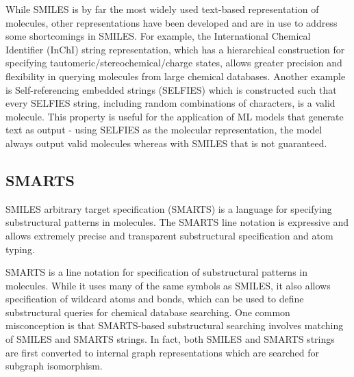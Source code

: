 While SMILES is by far the most widely used text-based representation of molecules, other representations have been developed and are in use to address some shortcomings in SMILES. For example, the International Chemical Identifier (InChI) \cite{Heller2013InChI} string representation, which has a hierarchical construction for specifying tautomeric/stereochemical/charge states, allows greater precision and flexibility in querying molecules from large chemical databases. Another example is Self-referencing embedded strings (SELFIES) \cite{Krenn2020Selfies} which is constructed such that every SELFIES string, including random combinations of characters, is a valid molecule. This property is useful for the application of ML models that generate text as output - using SELFIES as the molecular representation, the model always output valid molecules whereas with SMILES that is not guaranteed.

\subsection{SMARTS}

SMILES arbitrary target specification (SMARTS) is a language for specifying substructural patterns in molecules. The SMARTS line notation is expressive and allows extremely precise and transparent substructural specification and atom typing. %

SMARTS is a line notation for specification of substructural patterns in molecules. While it uses many of the same symbols as SMILES, it also allows specification of wildcard atoms and bonds, which can be used to define substructural queries for chemical database searching. One common misconception is that SMARTS-based substructural searching involves matching of SMILES and SMARTS strings. In fact, both SMILES and SMARTS strings are first converted to internal graph representations which are searched for subgraph isomorphism.

